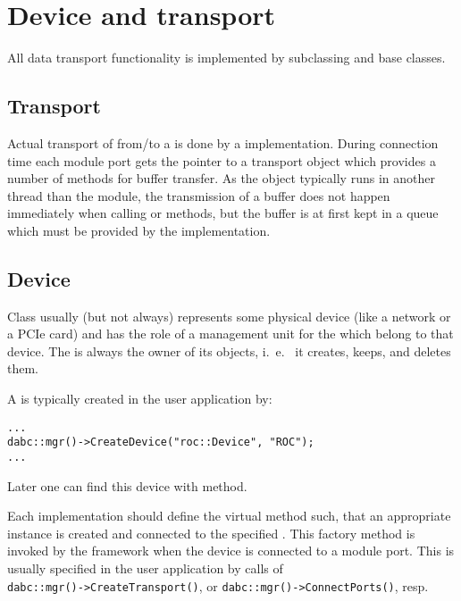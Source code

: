 \section{Device and transport}
\label{prog_plugin_device}
All data transport functionality is implemented by 
   subclassing   and  base classes.

\subsection{Transport}

Actual transport of  from/to a  is done by a  implementation.
During connection time each module port gets the pointer to a transport object
which provides a number of methods for buffer transfer. 
As the  object typically runs in another thread than the module,
the transmission of a buffer does not happen immediately when calling 
 or  methods, but
the buffer is at first kept in a queue which must be provided by the
 implementation.

 

\subsection{Device}
\label{prog_plugin_device_device}
Class  usually (but not always) represents some physical
device (like a network or a PCIe card) and has the role of a management unit for 
the  which belong to that device. 
The  is always the owner of its  objects, i.~e.~
it creates, keeps, and deletes them.

A  is typically created in the user application by:
\begin{small}
\begin{verbatim}
...
dabc::mgr()->CreateDevice("roc::Device", "ROC");
...
\end{verbatim}     
\end{small}

Later one can find this device with  method.

Each  implementation should define the virtual method  such, that an appropriate  instance 
is created and connected to the specified .
This factory method is invoked by the framework when the device is connected to 
a module port. This is usually specified in the user application by calls
of\\ 
{\tt dabc::mgr()->CreateTransport()}, or {\tt dabc::mgr()->ConnectPorts()},
resp.  

